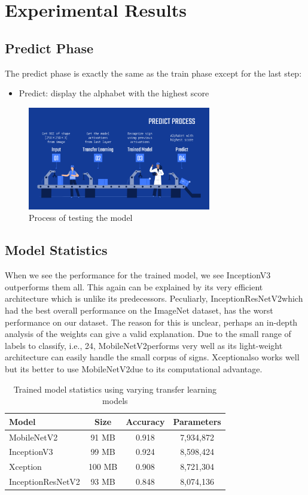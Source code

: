 \documentclass[twocolumn]{article}
\newcommand{\mobilenet}{MobileNetV2}
\newcommand{\xception}{Xception}
\newcommand{\inception}{InceptionV3}
\newcommand{\resnet}{InceptionResNetV2}
\begin{document}
\section{Experimental Results}

\subsection{Predict Phase}

The predict phase is exactly the same as the train phase except for the last 
step:
\begin{itemize}
	\item Predict: display the alphabet with the highest score
\end{itemize}

\begin{figure}[h]
\centering
\includegraphics[width=8cm]{./figures/predict process}
\caption{Process of testing the model}
\end{figure}

\subsection{Model Statistics}

When we see the performance for the trained model, we see \inception 
outperforms them all. This again can be explained by its very efficient 
architecture which is unlike its predecessors. Peculiarly, \resnet which had 
the best overall performance on the ImageNet dataset, has the worst 
performance on our dataset. The reason for this is unclear, perhaps an 
in-depth analysis of the weights can give a valid explanation. Due to the 
small range of labels to classify, i.e., 24, \mobilenet performs very well as 
its light-weight architecture can easily handle the small corpus of signs. 
\xception also works well but its better to use \mobilenet due to its 
computational advantage.

\begin{table}[h]
\centering
\begin{tabular}{ |l|c|c|c| }
	\hline
	\textbf{Model} & \textbf{Size} & \textbf{Accuracy} & \textbf{Parameters} \\ \hline
	\mobilenet & 91 MB & 0.918 & 7,934,872 \\ \hline
	\inception & 99 MB & 0.924 & 8,598,424 \\ \hline
	\xception & 100 MB & 0.908 & 8,721,304 \\ \hline
	\resnet & 93 MB & 0.848 & 8,074,136 \\
	\hline
\end{tabular}
\caption{Trained model statistics using varying transfer learning models}
\end{table}
\end{document}
